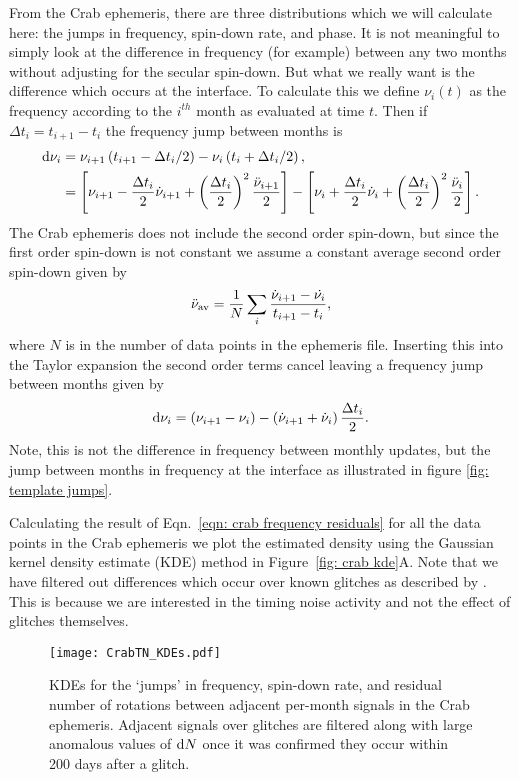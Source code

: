 \documentclass[../full_thesis/full_thesis.tex]{subfiles}
\begin{document}
From the Crab ephemeris, there are three distributions which we will calculate
here: the jumps in frequency, spin-down rate, and phase. It is not meaningful
to simply look at the difference in frequency (for example) between any two
months without adjusting for the secular spin-down. But what we really want is the
difference which occurs at the interface. To calculate this we define
$\nu_{i}(t)$ as the frequency according to the $i^{th}$ month as evaluated at
time $t$. Then if $\Delta t_{i} = t_{i+1} - t_{i}$ the frequency jump between
months is
\begin{align}
\mathrm{d}\nu_{i} &= \nu_{i+1}\left(t_{i+1}-\Delta t_{i}/2\right) -  \nu_{i}\left(t_{i}+\Delta t_{i}/2\right), \\
    &= \left[\nu_{i+1}- \frac{\Delta t_{i}}{2}\dot{\nu}_{i+1} + \left(\frac{\Delta t_{i}}{2}\right)^{2}\frac{\ddot{\nu}_{i+1}}{2}\right]
     - \left[\nu_{i} + \frac{\Delta t_{i}}{2}\dot{\nu}_{i}+ \left(\frac{\Delta t_{i}}{2}\right)^{2}\frac{\ddot{\nu}_{i}}{2}\right] .
\end{align}
The Crab ephemeris does not include the second order spin-down, but since the
first order spin-down is not constant we assume a constant average second order
spin-down given by
\begin{equation}
   \ddot{\nu}_{\textrm{av}} = \frac{1}{N}\sum_{i} \frac{\dot{\nu}_{i+1} - \dot{\nu_{i}}}{t_{i+1} - t_{i}},
   \label{eqn: average second order spin-down}
\end{equation}
where $N$ is in the number of data points in the ephemeris file. Inserting this
into the Taylor expansion the second order terms cancel leaving a frequency
jump between months given by
\begin{equation}
\mathrm{d}\nu_{i} = \left(\nu_{i+1}- \nu_{i}\right) -  \left(\dot{\nu}_{i+1}
               + \dot{\nu}_{i}\right)\frac{\Delta t_{i}}{2}.
\label{eqn: crab frequency residuals}
\end{equation}
Note, this is not the difference in frequency between monthly
updates, but the jump between months in frequency at the interface as illustrated in figure
\ref{fig: template jumps}.

Calculating the result of Eqn.~\eqref{eqn: crab frequency residuals} for all
the data points in the Crab ephemeris we plot the estimated density using the
Gaussian kernel density estimate (KDE) method \citep{Scipy} in Figure~\ref{fig:
crab kde}A. Note that we have filtered out differences which occur over known
glitches as described by \citet{Espinoza2011}. This is because we are
interested in the timing noise activity and not the effect of glitches
themselves.
\begin{figure}[ht]
\centering
\texttt{[image: CrabTN\_KDEs.pdf]}
\caption{KDEs for the `jumps' in frequency, spin-down rate, and residual number
of rotations between adjacent per-month signals in the Crab ephemeris.
Adjacent signals over glitches are filtered along with large anomalous values
of $\mathrm{d} N$ once it was confirmed they occur within 200 days after a glitch.}
\label{fig: crab kde}
\end{figure}
\end{document}
